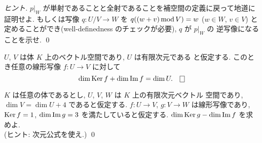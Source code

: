 \documentclass[12pt,twoside]{jarticle}
\begin{document}
\begin{proof}[ヒント]
  $p|_W$ が単射であることと全射であることを補空間の定義に戻って地道に
  証明せよ.
  もしくは写像 $q:U/V\to W$ を $q((w+v)\mathop{\mathrm{mod}}\nolimits V) = w$ ($w\in W$, $v\in V$) 
  と定めることができ(well-definedness のチェックが必要), $q$ が $p|_W$ の
  逆写像になることを示せ. \qed
\end{proof}


\begin{question}
  $U$, $V$ は体 $K$ 上のベクトル空間であり, $U$ は有限次元である
  と仮定する. このとき任意の線形写像 $f:U\to V$ に対して %
  \begin{equation*}
   \dim\Ker f + \dim\Image f = \dim U. \qed
  \end{equation*}
\end{question}



\begin{question}[5点]
$K$ は任意の体であるとし, $U$, $V$, $W$ は $K$ 上の有限次元ベクトル
空間であり, $\dim V = \dim U + 4$ であると仮定する.
$f:U\to V$, $g:V\to W$ は線形写像であり, $\mathop{\mathrm{Ker}}\nolimits f = 1$, $\dim\mathop{\mathrm{Im}}\nolimits g = 3$ 
を満たしていると仮定する.
$\dim\mathop{\mathrm{Ker}}\nolimits g - \dim\mathop{\mathrm{Im}}\nolimits f$ を求めよ. 
\\(ヒント: 次元公式を使え.)
\qed 
\end{question}

\end{document}
